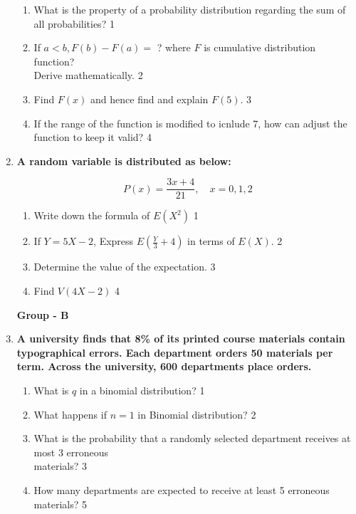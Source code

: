 \documentclass[12pt]{article}
\begin{document}
\begin{enumerate}
  \begin{enumerate}
   
     \item What is the property of a probability distribution regarding the sum of \\ all probabilities? \hfill 1
     \item If $a<b, F(b) - F(a) =$ ? where $F$ is cumulative distribution function? \\ Derive mathematically. \hfill 2
    \item  
	Find $F(x)$ and hence find and explain $F(5)$. \hfill 3
    \item
	If the range of the function is modified to icnlude 7, how can adjust the function to keep it valid? \hfill 4
  \end{enumerate}
  
          \item \textbf{A random variable is distributed as below:}
        
        \begin{center}
  \textbf{\[
P(x) = \frac{3x + 4}{21}, \quad x = 0, 1, 2
\]
}
  \end{center}

  \begin{enumerate}
    \item Write down the formula of $E(X^2)$ \hfill 1
    \item If $Y = 5X - 2$, Express $E\left(\frac{Y}{3} + 4\right)$ in terms of $E(X)$. \hfill 2
    \item
    	Determine the value of the expectation. \hfill 3
     \item
     	Find $V(4X-2)$ \hfill 4
  \end{enumerate}
  

\newpage

\begin{center}
\textbf{Group  - B}
\end{center}
  
  \item  
  \textbf{A university finds that 8\% of its printed course materials contain typographical errors. Each department orders 50 materials per term. Across the university, 600 departments place orders.}  

  \begin{enumerate}  
    \item What is $q$ in a binomial distribution? \hfill 1
    \item What happens if $n=1$ in Binomial distribution? \hfill 2
    \item  
      What is the probability that a randomly selected department receives at  most 3 erroneous \\ materials? \hfill 3  
    \item  
      How many departments are expected to receive at least 5 erroneous materials? \hfill 5  
  \end{enumerate}


\end{enumerate}
\end{document}
